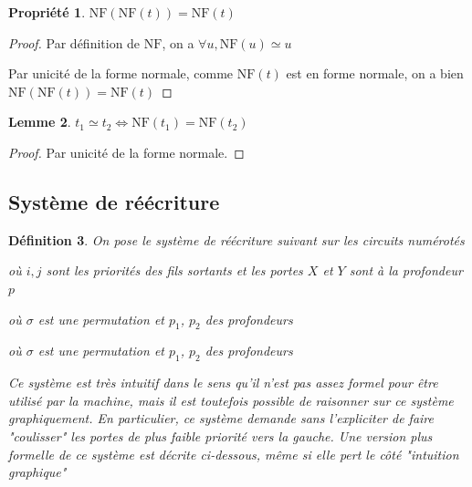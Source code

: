 \documentclass[12pt, a4paper]{article}
\newtheorem{definition}{Définition}[subsection]
\newtheorem{lemma}[definition]{Lemme}
\newtheorem{property}[definition]{Propriété}
\newcommand{\smallinput}[1]{\scalebox{0.75}{}}
\def\leqv{\Longleftrightarrow}
\def\nf{ \mathrm{NF} }
\begin{document}
\begin{property}
    $\nf(\nf(t)) = \nf(t)$
\end{property}
\begin{proof}
    Par définition de $\nf$, on a $\forall u, \nf(u) \simeq u$

    Par unicité de la forme normale, comme $\nf(t)$ est en forme normale, on a bien $\nf(\nf(t)) = \nf(t)$
\end{proof}

\begin{lemma}
    $t_1 \simeq t_2 \leqv \nf(t_1) = \nf(t_2)$
\end{lemma}
\begin{proof}
    Par unicité de la forme normale.
\end{proof}

\subsection{Système de réécriture}

\begin{definition}
    On pose le système de réécriture suivant sur les circuits numérotés

    \begin{center}
        
    \end{center}
    où $i,j$ sont les priorités des fils sortants et les portes $X$ et $Y$ sont à la profondeur $p$

    \begin{center}
        \smallinput{pic/through_perm1.tikz}
    \end{center}
    où $\sigma$ est une permutation et $p_1$, $p_2$ des profondeurs
    
    \begin{center}
        \smallinput{pic/through_perm2.tikz}
    \end{center}
    où $\sigma$ est une permutation et $p_1$, $p_2$ des profondeurs

    Ce système est très intuitif dans le sens qu'il n'est pas assez formel pour être utilisé par la machine, mais il est toutefois possible de raisonner sur ce système graphiquement. En particulier, ce système demande sans l'expliciter de faire "coulisser" les portes de plus faible priorité vers la gauche. Une version plus formelle de ce système est décrite ci-dessous, même si elle pert le côté "intuition graphique"
\end{definition}
\end{document}
